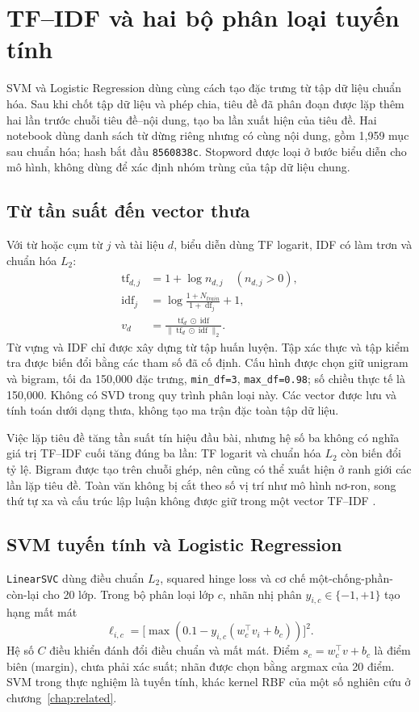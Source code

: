 \section{TF--IDF và hai bộ phân loại tuyến tính}
\label{sec:linear_models}
SVM và Logistic Regression dùng cùng cách tạo đặc trưng từ tập dữ liệu chuẩn hóa. Sau khi chốt tập dữ liệu và phép chia, tiêu đề đã phân đoạn được lặp thêm hai lần trước chuỗi tiêu đề--nội dung, tạo ba lần xuất hiện của tiêu đề. Hai notebook dùng danh sách từ dừng riêng nhưng có cùng nội dung, gồm 1,959 mục sau chuẩn hóa; hash bắt đầu \texttt{8560838c}. Stopword được loại ở bước biểu diễn cho mô hình, không dùng để xác định nhóm trùng của tập dữ liệu chung.

\subsection{Từ tần suất đến vector thưa}
Với từ hoặc cụm từ $j$ và tài liệu $d$, biểu diễn dùng TF logarit, IDF có làm trơn và chuẩn hóa $L_2$:
\begin{align}
\operatorname{tf}_{d,j}&=1+\log n_{d,j}\quad(n_{d,j}>0),\\
\operatorname{idf}_j&=\log\frac{1+N_{train}}{1+\operatorname{df}_j}+1,\\
v_d&=\frac{\operatorname{tf}_d\odot\operatorname{idf}}{\|\operatorname{tf}_d\odot\operatorname{idf}\|_2}.
\end{align}
Từ vựng và IDF chỉ được xây dựng từ tập huấn luyện. Tập xác thực và tập kiểm tra được biến đổi bằng các tham số đã cố định. Cấu hình được chọn giữ unigram và bigram, tối đa 150,000 đặc trưng, \texttt{min\_df=3}, \texttt{max\_df=0.98}; số chiều thực tế là 150,000. Không có SVD trong quy trình phân loại này. Các vector được lưu và tính toán dưới dạng thưa, không tạo ma trận đặc toàn tập dữ liệu.

Việc lặp tiêu đề tăng tần suất tín hiệu đầu bài, nhưng hệ số ba không có nghĩa giá trị TF--IDF cuối tăng đúng ba lần: TF logarit và chuẩn hóa $L_2$ còn biến đổi tỷ lệ. Bigram được tạo trên chuỗi ghép, nên cũng có thể xuất hiện ở ranh giới các lần lặp tiêu đề. Toàn văn không bị cắt theo số vị trí như mô hình nơ-ron, song thứ tự xa và cấu trúc lập luận không được giữ trong một vector TF--IDF \citep{kowsari2019}.

\subsection{SVM tuyến tính và Logistic Regression}
\texttt{LinearSVC} dùng điều chuẩn $L_2$, squared hinge loss và cơ chế một-chống-phần-còn-lại cho 20 lớp. Trong bộ phân loại lớp $c$, nhãn nhị phân $y_{i,c}\in\{-1,+1\}$ tạo hạng mất mát
\begin{equation}
\ell_{i,c}=\bigl[\max(0.1-y_{i,c}(w_c^\top v_i+b_c))\bigr]^2.
\end{equation}
Hệ số $C$ điều khiển đánh đổi điều chuẩn và mất mát. Điểm $s_c=w_c^\top v+b_c$ là điểm biên (margin), chưa phải xác suất; nhãn được chọn bằng argmax của 20 điểm. SVM trong thực nghiệm là tuyến tính, khác kernel RBF của một số nghiên cứu ở chương~\ref{chap:related}.

